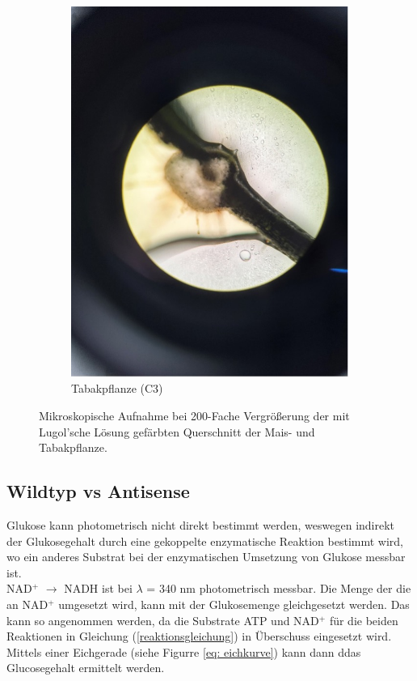 \documentclass[10pt,a4paper]{article}
\begin{document}
\begin{figure}[H]
\begin{subfigure}[b]{0.311\textwidth}
				\includegraphics[width=\textwidth]{Tabakmesophyl.jpg}
				\caption{Tabakpflanze (C3)}
				\label{fig:tabakfärbung}
			\end{subfigure}

			\caption{Mikroskopische Aufnahme bei 200-Fache Vergrößerung der mit Lugol'sche Lösung gefärbten Querschnitt der Mais- und Tabakpflanze. }
			\label{fig:C3vsC4}
		\end{figure}
		
	\subsection{Wildtyp vs Antisense}
		Glukose kann photometrisch nicht direkt bestimmt werden, weswegen indirekt der Glukosegehalt durch eine gekoppelte enzymatische Reaktion bestimmt wird, wo ein anderes Substrat bei der enzymatischen Umsetzung von Glukose messbar ist.\\
		 NAD$^+$ $\longrightarrow$ NADH ist bei $\lambda$ = 340 nm photometrisch messbar.
		 Die Menge der die an NAD$^+$ umgesetzt wird, kann mit der Glukosemenge gleichgesetzt werden.
		 Das kann so angenommen werden, da die Substrate ATP und NAD$^+$ für die beiden Reaktionen in Gleichung (\ref{reaktionsgleichung}) in Überschuss eingesetzt wird.\\
		 Mittels einer Eichgerade (siehe Figurre \ref{eq: eichkurve}) kann dann ddas Glucosegehalt ermittelt werden.
\end{document}
